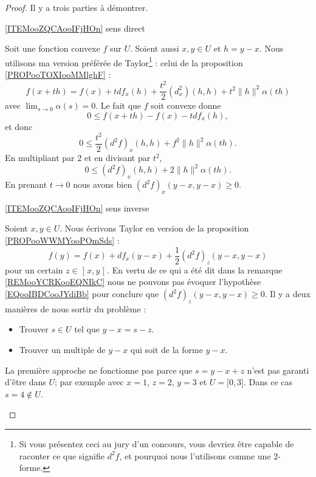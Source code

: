 \begin{proof}
    Il y a trois parties à démontrer.
    \begin{subproof}
    \item[\ref{ITEMooZQCAooIFjHOn} sens direct]

        Soit une fonction convexe \( f\) sur \( U\). Soient aussi \( x,y\in U\) et \( h=y-x\). Nous utilisons ma version préférée de Taylor\footnote{Si vous présentez ceci au jury d'un concours, vous devriez être capable de raconter ce que signifie \( d^2f\), et pourquoi nous l'utilisons comme une \( 2\)-forme.} : celui de la proposition \ref{PROPooTOXIooMMlghF} :
        \begin{equation}
            f(x+th)=f(x)+tdf_x(h)+\frac{ t^2 }{2}(d^2_x)(h,h)+t^2\| h \|^2\alpha(th)
        \end{equation}
        avec \( \lim_{s\to 0}\alpha(s)=0\). Le fait que \( f\) soit convexe donne
        \begin{equation}
            0\leq f(x+th)-f(x)-tdf_x(h),
        \end{equation}
        et donc
        \begin{equation}
            0\leq \frac{ t^2 }{2}(d^2f)_x(h,h)+f^2\| h \|^2\alpha(th).
        \end{equation}
        En multipliant par \( 2\) et en divisant par \( t^2\),
        \begin{equation}
            0\leq (d^2f)_x(h,h)+2\| h \|^2\alpha(th).
        \end{equation}
        En prenant \( t\to 0\) nous avons bien  \( (d^2f)_x(y-x,y-x)\geq 0\).

    \item[\ref{ITEMooZQCAooIFjHOn} sens inverse]

        Soient \( x,y\in U\). Nous écrivons Taylor en version de la proposition \ref{PROPooWWMYooPOmSds} :
        \begin{equation}
            f(y)=f(x)+df_x(y-x)+\frac{ 1 }{2}(d^2f)_z(y-x,y-x)
        \end{equation}
    pour un certain \( z\in\mathopen] x , y \mathclose[\). En vertu de ce qui a été dit dans la remarque \ref{REMooYCRKooEQNIkC} nous ne pouvons pas évoquer l'hypothèse \eqref{EQooIBDCooJYdiBb} pour conclure que \( (d^2f)_z(y-x,y-x)\geq 0\). Il y a deux manières de nous sortir du problème :
        \begin{itemize}
            \item Trouver \( s\in U\) tel que \( y-x=s-z\).
            \item Trouver un multiple de \( y-x\) qui soit de la forme \( y-x\).
        \end{itemize}
        La première approche ne fonctionne pas parce que \( s=y-x+z\) n'est pas garanti d'être dans \( U\); par exemple avec \( x=1\), \( z=2\), \( y=3\) et \( U=\mathopen[ 0 , 3 \mathclose]\). Dans ce cas \( s=4\notin U\).


\end{subproof}
\end{proof}
